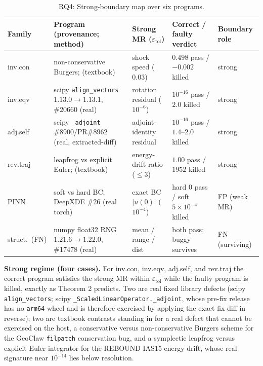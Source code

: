 \documentclass[review,12pt,authoryear]{elsarticle}
\begin{document}
{\def\LTcaptype{table} %
\begin{longtable}[]{@{}p{1.6cm}p{3.4cm}p{2.5cm}p{2.6cm}p{1.7cm}@{}}
\caption{RQ4: Strong-boundary map over six programs.}\label{tab:p2-30}\\
\toprule\noalign{}
Family & Program (provenance; method) & Strong MR ($\varepsilon_{\mathrm{tol}}$) & Correct / faulty verdict & Boundary role \\
\midrule\noalign{}
\endfirsthead
\endhead
\bottomrule\noalign{}
\endlastfoot
inv.con & non-conservative Burgers; \citep{hou1994nonconservative} (textbook) & shock speed ($0.03$) & $0.498$ pass / $-0.002$ killed & strong \\
inv.eqv & scipy \texttt{align\_vectors} $1.13.0\to1.13.1$, \#20660 (real) & rotation residual ($10^{-6}$) & $10^{-16}$ pass / $2.0$ killed & strong \\
adj.self & scipy \texttt{\_adjoint} \#8900/PR\#8962 (real, extracted-diff) & adjoint-identity residual & $10^{-16}$ pass / $1.4$--$2.0$ killed & strong \\
rev.traj & leapfrog vs explicit Euler; \citep{hairer2006geometric} (textbook) & energy-drift ratio ($\leq 3$) & $1.00$ pass / $1952$ killed & strong \\
PINN & soft vs hard BC; DeepXDE \#26 (real torch) & exact BC $|u(0)|$ ($10^{-4}$) & hard $0$ pass / soft $5\times10^{-4}$ killed & FP (weak MR) \\
struct.\ (FN) & numpy float32 RNG $1.21.6\to1.22.0$, \#17478 (real) & mean / range / dist & both pass; buggy survives & FN (surviving) \\
\end{longtable}
}

\textbf{Strong regime (four cases).} For inv.con, inv.eqv, adj.self, and
rev.traj the correct program satisfies the strong MR within
$\varepsilon_{\mathrm{tol}}$ while the faulty program is killed, exactly
as Theorem 2 predicts. Two are real fixed library defects (scipy
\texttt{align\_vectors}; scipy \texttt{\_ScaledLinearOperator.\_adjoint},
whose pre-fix release has no \texttt{arm64} wheel and is therefore
exercised by applying the exact fix diff in reverse); two are textbook
contrasts standing in for a real defect that cannot be exercised on the
host, a conservative versus non-conservative Burgers scheme for the
GeoClaw \texttt{filpatch} conservation bug, and a symplectic leapfrog
versus explicit Euler integrator for the REBOUND IAS15 energy drift, whose
real signature near $10^{-14}$ lies below resolution.
\end{document}
